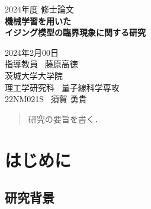 \documentclass[a4paper,11pt]{jsreport}
\begin{document}
\thispagestyle{empty}
\begin{center}

  \vspace{20mm}
  {\Large\noindent 2024年度 修士論文}\\
  \vspace{40mm}
  {\huge\noindent\textbf{機械学習を用いた}}\\
  \medskip
  {\huge\noindent\textbf{イジング模型の臨界現象に関する研究}}\\
  \vspace{\baselineskip}
  \vspace{40mm}

  {\Large\noindent
    2024年2月00日\\
    \vspace{\baselineskip}
    指導教員 \ 藤原高徳    \\
    \vspace{\baselineskip}
    茨城大学大学院\\
    理工学研究科 \ 量子線科学専攻 \\
    \vspace{\baselineskip}
    22NM021S \ 須賀 勇貴\\
  }
  \vspace{40mm}

\end{center}

\thispagestyle{empty}
\clearpage

\renewcommand{\abstractname}{要旨}

\begin{abstract}
  研究の要旨を書く．
\end{abstract}

\thispagestyle{empty}
\clearpage


\tableofcontents

\pagestyle{fancy}
\lhead{\rightmark}
\renewcommand{\chaptermark}[1]{\markboth{第\ \normalfont\thechapter\ 章~~#1}{}}
\chapter{はじめに} %
\section{研究背景}
\end{document}
